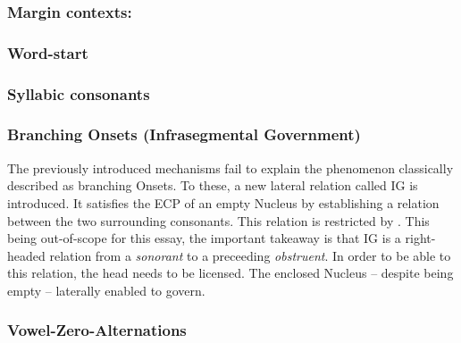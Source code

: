 \subsubsection{Margin contexts:}
\subsubsection{Word-start \ctx{\#\_}}\label{intro:obj:word start}
\begin{structure}{}
  \wordstart

\end{structure}
\TODO{}

\subsubsection{Syllabic consonants}
\TODO{}

\subsubsection{Branching Onsets (Infrasegmental Government)}
The previously introduced mechanisms fail to explain the phenomenon classically described
as branching Onsets. To  these, a new lateral relation called
\gls{IG} is introduced. It satisfies the
\gls{ECP}
of an empty Nucleus by establishing a relation between the two surrounding consonants.
This relation is restricted by .
This being out-of-scope for this essay, the important takeaway is that
\gls{IG} is a right-headed relation from a \emph{sonorant} to a preceeding \emph{obstruent}.
In order to be able to  this relation, the head needs to be licensed.
The enclosed Nucleus -- despite being empty --  laterally enabled to govern.


\subsubsection{Vowel-Zero-Alternations}
\TODO{}

